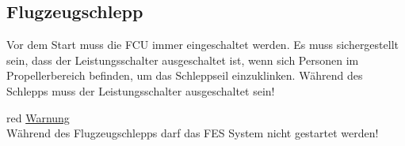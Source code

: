 \subsection{Flugzeugschlepp}
Vor dem Start muss die FCU immer eingeschaltet werden. Es muss sichergestellt sein, dass der Leistungsschalter ausgeschaltet ist, wenn sich Personen im Propellerbereich befinden, um das Schleppseil einzuklinken. Während des Schlepps muss der Leistungsschalter ausgeschaltet sein!\\

\begin{color}{red}
\large{\underline{Warnung}}\\
Während des Flugzeugschlepps darf das FES System nicht
gestartet werden!
\end{color}\\

